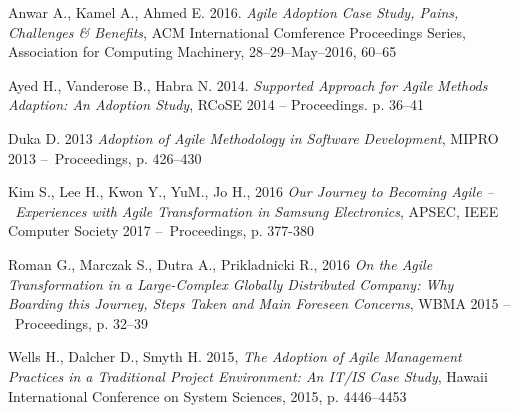 \noindent [P1] Anwar A., Kamel A., Ahmed E. 2016. \textit{Agile Adoption Case Study, Pains, Challenges \& Benefits}, ACM International Comference Proceedings Series, Association for Computing Machinery, 28–29–May–2016, 60–65

\noindent [P2] Ayed H., Vanderose B., Habra N. 2014. \textit{Supported Approach for Agile Methods Adaption: An Adoption Study}, RCoSE 2014 – Proceedings. p. 36–41

\noindent [P3] Duka D. 2013 \textit{Adoption of Agile Methodology in Software Development}, MIPRO 2013 – Proceedings, p. 426–430

\noindent [P4] Kim S., Lee H., Kwon Y., YuM., Jo H., 2016 \textit{Our Journey to Becoming Agile – Experiences with Agile Transformation in Samsung Electronics}, APSEC, IEEE Computer Society 2017 – Proceedings, p. 377-380

\noindent [P5] Roman G., Marczak S., Dutra A., Prikladnicki R., 2016 \textit{On the Agile Transformation in a Large-Complex Globally Distributed Company: Why Boarding this Journey, Steps Taken and Main Foreseen Concerns}, WBMA 2015 – Proceedings, p. 32–39

\noindent [P6] Wells H., Dalcher D., Smyth H. 2015, \textit{The Adoption of Agile Management Practices in a Traditional Project Environment: An IT/IS Case Study}, Hawaii International Conference on System Sciences, 2015, p. 4446–4453
